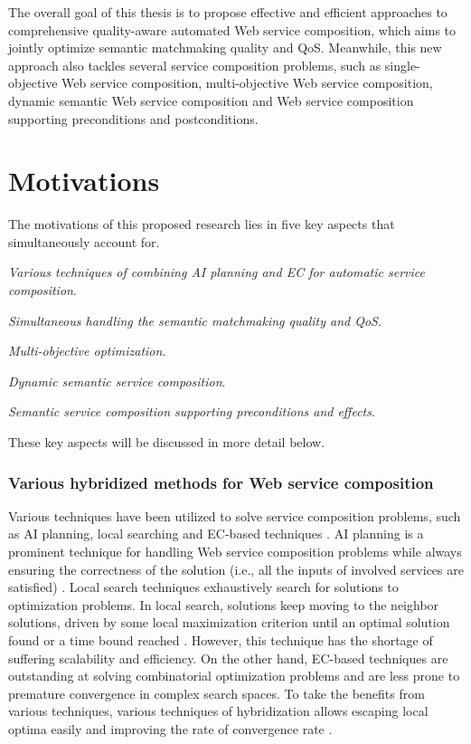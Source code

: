 The overall goal of this thesis is to propose effective and efficient approaches to comprehensive quality-aware automated Web service composition, which aims to jointly optimize semantic matchmaking quality and QoS. Meanwhile, this new approach also tackles several service composition problems, such as single-objective Web service composition, multi-objective Web service composition, dynamic semantic Web service composition and Web service composition supporting preconditions and postconditions.

\section{Motivations}\label{C:motivation}
The motivations of this proposed research lies in five key aspects that simultaneously account for. 
\begin{enumerate*}
 \item \emph{Various techniques of combining AI planning and EC for automatic service composition}.
 \item \emph{Simultaneous handling the semantic matchmaking quality and QoS}.
 \item \emph{Multi-objective optimization}.
 \item \emph{Dynamic semantic service composition}.
 \item \emph{Semantic service composition supporting preconditions and effects}.
\end{enumerate*}
These key aspects will be discussed in more detail below.
\subsubsection{Various hybridized methods for Web service composition}

Various techniques have been utilized to solve service composition problems, such as AI planning, local searching and EC-based techniques \cite{feng2013dynamic,parejo2008qos,qi2010combining,wang2014automated}. AI planning is a prominent technique for handling Web service composition problems while always ensuring the correctness of the solution (i.e., all the inputs of involved services are satisfied) \cite{wang2014automated}. Local search techniques exhaustively search for solutions to optimization problems. In local search, solutions keep moving to the neighbor solutions, driven by some local maximization criterion until an optimal solution found or a time bound reached \cite{parejo2008qos}. However, this technique has the shortage of suffering scalability and efficiency. On the other hand, EC-based techniques are outstanding at solving combinatorial optimization problems and are less prone to premature convergence in complex search spaces. To take the benefits from various techniques,  various techniques of hybridization allows escaping local optima easily and improving the rate of convergence rate \cite{renders1996hybrid}.

